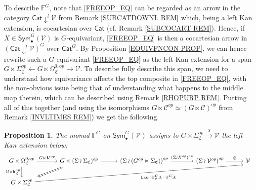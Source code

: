 \documentclass[a4paper,10pt
,draft
]{article}%
\numberwithin{equation}{section}
\numberwithin{figure}{section}
\newtheorem{proposition}[equation]{Proposition}%
\theoremstyle{definition} %
\DeclareMathOperator{\Lan}{Lan}%
\newcommand{\V}{\ensuremath{\mathcal V}}
\newcommand{\1}{\ensuremath{\mathbbm 1}}%
\begin{document}
To describe $\mathbb{F}^G$,
note that \eqref{FREEOP_EQ}
can be regarded as an arrow in 
the category $\mathsf{Cat} \downarrow^l \V$
from Remark \ref{SUBCATDOWNL REM}
which, being a left Kan extension, is cocartesian over $\mathsf{Cat}$ (cf. Remark \ref{SUBCOCART REM}).
Hence, if $X \in \mathsf{Sym}_{\bullet}^G(\V)$
is $G$-equivariant, 
\eqref{FREEOP_EQ} is then a cocartesian arrow in 
$\left(\mathsf{Cat} \downarrow^l \V\right)^G$
over $\mathsf{Cat}^G$.
By Proposition \ref{EQUIVFNCON PROP},
we can hence rewrite 
such a $G$-equivariant \eqref{FREEOP_EQ}
as the left Kan extension for a span
$G \ltimes \Sigma^{op}_{\mathfrak{C}}
\leftarrow 
G \ltimes \Omega^{0,op}_{\mathfrak{C}}
\to 
\V$.
To describe fully describe this span,
we need to understand how equivariance 
affects the top composite in \eqref{FREEOP_EQ},
with the non-obvious issue being that of understanding
what happens to the middle map
therein, which can be described using
Remark \ref{RHOPURP REM}.
Putting all of this together
(and using the isomorphisms
$G \ltimes \mathcal{C}^{op} \simeq (G \ltimes \mathcal{C})^{op}$
from Remark \ref{INVLTIMES REM})
we get the following.


\begin{proposition}\label{FGC PROP}
      The monad $\mathbb{F}^G$ on $\mathsf{Sym}^G_{\bullet}(\V)$
      assigns to 
      $G \ltimes \Sigma^{op}_{\mathfrak{C}} \xrightarrow{X} \V$
      the left Kan extension below.
\begin{equation}\label{FGC_EQ}
\begin{tikzcd}[column sep = 28pt]
	G \ltimes \Omega^{0,op}_{\mathfrak{C}}
	\arrow[d, "G \ltimes \mathsf{lr}_{\mathfrak C}^{op}"']
	\arrow[r, "G \ltimes \boldsymbol{V}^{op}"]
&[6pt]
	G \ltimes (\Sigma \wr \Sigma_{\mathfrak{C}})^{op} \arrow{r}
	\arrow[dl, Rightarrow, shorten >=0.15cm,shorten <=0.15cm]
&
	\left( \Sigma \wr \left( G^{op} \ltimes \Sigma_{\mathfrak{C}} \right) \right)^{op}
	\arrow[r, "(\Sigma \wr X^{op})^{op}"]
&[10pt]
	\left(\Sigma \wr \V^{op}\right)^{op} \arrow[r, "\otimes"]
&
	\V
\\
	G \ltimes \Sigma^{op}_{\mathfrak{C}}
	\arrow[urrrr, "\Lan = \mathbb F_{\mathfrak{C}}^G X = \mathbb F^G X"', end anchor = south west]
\end{tikzcd}
      \end{equation}
\end{proposition}
\end{document}
